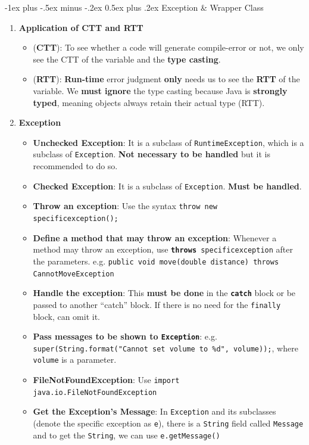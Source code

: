 \documentclass[10pt, landscape]{article}
\makeatletter
\renewcommand{\section}{\@startsection{section}{1}{0mm}%
                                {-1ex plus -.5ex minus -.2ex}%
                                {0.5ex plus .2ex}%
                                {\normalfont\large\bfseries}}
\makeatother
\begin{document}
\begin{multicols}{4}
\section{Exception \& Wrapper Class}
\begin{enumerate}
    \item \textbf{Application of CTT and RTT}
    \begin{itemize}
        \item (\textbf{CTT}): To see whether a code will generate compile-error or not, we only see the CTT of the variable and the \textbf{type casting}.
        \item (\textbf{RTT}): \textbf{Run-time} error judgment \textbf{only} needs us to see the \textbf{RTT} of the variable. We \textbf{must ignore} the type casting because Java is \textbf{strongly typed}, meaning objects always retain their actual type (RTT).
    \end{itemize}
    \item \textbf{Exception}
    \begin{itemize}
        \item \textbf{Unchecked Exception}: It is a subclass of \texttt{RuntimeException}, which is a subclass of \texttt{Exception}. \textbf{Not necessary to be handled} but it is recommended to do so.
        \item \textbf{Checked Exception}: It is a subclass of \texttt{Exception}. \textbf{Must be handled}.
        \item \textbf{Throw an exception}: Use the syntax \texttt{throw new specificexception();}
        \item \textbf{Define a method that may throw an exception}: Whenever a method may throw an exception, use \texttt{\textbf{throws} specificexception} after the parameters. e.g. \texttt{public void move(double distance) throws CannotMoveException}
        \item \textbf{Handle the exception}: This \textbf{must be done} in the \texttt{\textbf{catch}} block or be passed to another ``catch'' block. If there is no need for the \texttt{finally} block, can omit it.
        \item \textbf{Pass messages to be shown to \texttt{Exception}}: e.g. \texttt{super(String.format("Cannot set volume to \%d", volume));}, where \texttt{volume} is a parameter.
        \item \textbf{FileNotFoundException}: Use \texttt{import java.io.FileNotFoundException}
        \item \textbf{Get the Exception's Message}: In \texttt{Exception} and its subclasses (denote the specific exception as \texttt{e}), there is a \texttt{String} field called \texttt{Message} and to get the \texttt{String}, we can use \texttt{e.getMessage()}
    \end{itemize}
\end{enumerate}


\end{multicols}
\end{document}
